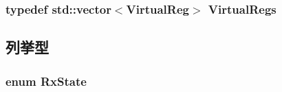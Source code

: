 \label{classSinic_1_1Device_a825103ea4ae04062ca13fa65d29bcfc6}
\hypertarget{classSinic_1_1Device_aa30f329d058c1b4134f557c529c86ca2}{
\subsubsection[{VirtualRegs}]{\setlength{\rightskip}{0pt plus 5cm}typedef {\bf std::vector}$<${\bf VirtualReg}$>$ {\bf VirtualRegs}}}
\label{classSinic_1_1Device_aa30f329d058c1b4134f557c529c86ca2}


\subsection{列挙型}
\hypertarget{classSinic_1_1Device_afa22e66eb5ea0daab0f0cd0360936f82}{
\subsubsection[{RxState}]{\setlength{\rightskip}{0pt plus 5cm}enum {\bf RxState}}}
\label{classSinic_1_1Device_afa22e66eb5ea0daab0f0cd0360936f82}
